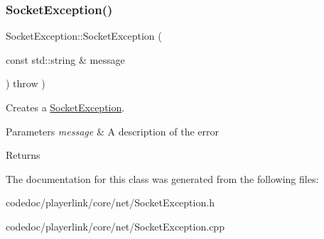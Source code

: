 \subsubsection{\texorpdfstring{Socket\+Exception()}{SocketException()}}
{\footnotesize\ttfamily Socket\+Exception\+::\+Socket\+Exception (\begin{DoxyParamCaption}\item[{const std\+::string \&}]{message }\end{DoxyParamCaption}) throw  ) }



Creates a \hyperlink{classSocketException}{Socket\+Exception}. 


\begin{DoxyParams}{Parameters}
{\em message} & A description of the error \\
\hline
\end{DoxyParams}
\begin{DoxyReturn}{Returns}

\end{DoxyReturn}


The documentation for this class was generated from the following files\+:\begin{DoxyCompactItemize}
\item 
codedoc/playerlink/core/net/Socket\+Exception.\+h\item 
codedoc/playerlink/core/net/Socket\+Exception.\+cpp\end{DoxyCompactItemize}
